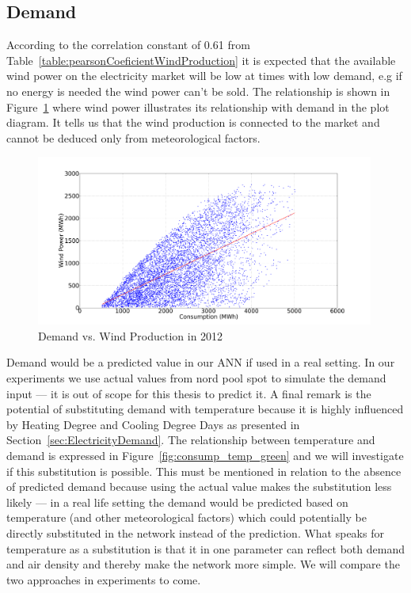 \subsection{Demand}
\label{sec:demandWindProduction}
According to the correlation constant of 0.61 from Table~\ref{table:pearsonCoeficientWindProduction} it is expected that the available wind power on the electricity market will be low at times with low demand, e.g if no energy is needed the wind power can't be sold.  The relationship is shown in Figure~\ref{fig:demandVsWindProduction} where wind power illustrates its relationship with demand in the plot diagram. It tells us that the wind production is connected to the market and cannot be deduced only from meteorological factors.

\begin{figure}[h!]
\centering
\includegraphics[width=0.99\textwidth]{billeder/consumptionVsWindProduction.png}
\caption{Demand vs. Wind Production in 2012}
\label{fig:demandVsWindProduction}
\end{figure}

\noindent Demand would be a predicted value in our ANN if used in a real setting. In our experiments we use actual values from nord pool spot to simulate the demand input --- it is out of scope for this thesis to predict it. A final remark is the potential of substituting demand with temperature because it is highly influenced by Heating Degree and Cooling Degree Days as presented in Section~\ref{sec:ElectricityDemand}. The relationship between temperature and demand is expressed in Figure~\ref{fig:consump_temp_green} and we will investigate if this substitution is possible. This must be mentioned in relation to the absence of predicted demand because using the actual value makes the substitution less likely --- in a real life setting the demand would be predicted based on temperature (and other meteorological factors) which could potentially be directly substituted in the network instead of the prediction. What speaks for temperature as a substitution is that it in one parameter can reflect both demand and air density and thereby make the network more simple. We will compare the two approaches in experiments to come. 

